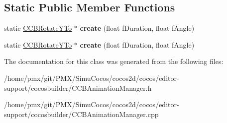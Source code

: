 \subsection*{Static Public Member Functions}
\begin{DoxyCompactItemize}
\item 
\mbox{\label{classcocosbuilder_1_1CCBRotateYTo_ae1c3f1347e5d7f784d990204140de4a8}} 
static \hyperlink{classcocosbuilder_1_1CCBRotateYTo}{C\+C\+B\+Rotate\+Y\+To} $\ast$ {\bfseries create} (float f\+Duration, float f\+Angle)
\item 
\mbox{\label{classcocosbuilder_1_1CCBRotateYTo_ad33f3c688ac1060ab2645d40fcee55f4}} 
static \hyperlink{classcocosbuilder_1_1CCBRotateYTo}{C\+C\+B\+Rotate\+Y\+To} $\ast$ {\bfseries create} (float f\+Duration, float f\+Angle)
\end{DoxyCompactItemize}


The documentation for this class was generated from the following files\+:\begin{DoxyCompactItemize}
\item 
/home/pmx/git/\+P\+M\+X/\+Simu\+Cocos/cocos2d/cocos/editor-\/support/cocosbuilder/C\+C\+B\+Animation\+Manager.\+h\item 
/home/pmx/git/\+P\+M\+X/\+Simu\+Cocos/cocos2d/cocos/editor-\/support/cocosbuilder/C\+C\+B\+Animation\+Manager.\+cpp\end{DoxyCompactItemize}
